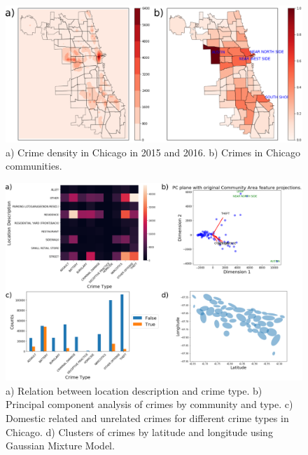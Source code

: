\documentclass[12pt]{article}
\begin{document}
\begin{figure}[ht]
\includegraphics[scale=0.4]{figure/pos.eps}
\centering
\caption{a) Crime density in Chicago in 2015 and 2016. b) Crimes in Chicago communities.}
\label{fig:pos}
\end{figure}


\begin{figure}[ht]
\includegraphics[scale=0.3]{figure/location.eps}
\centering
\caption{a) Relation between location description and crime type. b) Principal component analysis of crimes by community and type. c) Domestic related and unrelated crimes for different crime types in Chicago. d) Clusters of crimes by latitude and longitude using Gaussian Mixture Model.}
\label{fig:location}
\end{figure}
\end{document}
